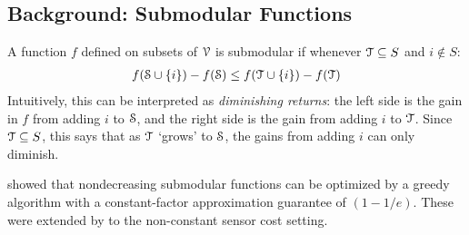 \subsection{Background: Submodular Functions}
A function $f$ defined on subsets of $\V$ is submodular if whenever $\T \subseteq S$ and $i \notin S$:
\begin{align}
f(\S \cup \{i\}) - f(\S) \le f(\T \cup \{i\}) - f(\T) 
\end{align}
Intuitively, this can be interpreted as \emph{diminishing returns}: the left side is the gain in $f$ from adding $i$ to $\S$, and the right side is the gain from adding $i$ to $\T$. Since $\T \subseteq S$, this says that as $\T$ `grows' to $\S$, the gains from adding $i$ can only diminish.

\cite{nemhauser1978analysis} showed that nondecreasing submodular functions can be optimized by a greedy algorithm with a constant-factor approximation guarantee of $(1-1/e)$. These were extended by \cite{sviridenko2004note} to the non-constant sensor cost setting. 

